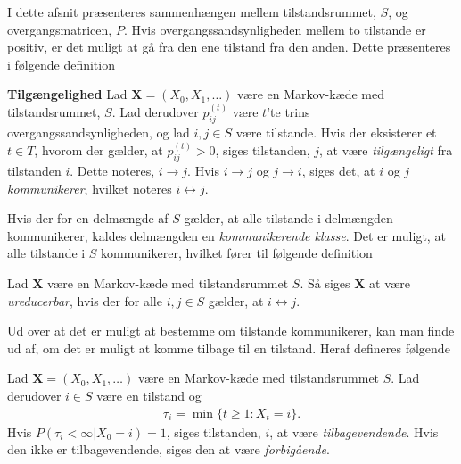 I dette afsnit præsenteres sammenhængen mellem tilstandsrummet, $S$, og overgangsmatricen, $P$. Hvis overgangssandsynligheden mellem to tilstande er positiv, er det muligt at gå fra den ene tilstand fra den anden. Dette præsenteres i følgende definition

\begin{minipage}\textwidth
\begin{defn}\textbf{Tilgængelighed} \label{def:tilgængelighed} %
\newline
Lad $\bm X = (X_0, X_1, \dots)$ være en Markov-kæde med tilstandsrummet, $S$. Lad derudover $p_{ij}^{(t)}$ være $t$'te trins overgangssandsynligheden, og lad $i,j \in S$ være tilstande. Hvis der eksisterer et $t\in T$, hvorom der gælder, at $p_{ij}^{(t)}>0$, siges tilstanden, $j$, at være \textit{tilgængeligt} fra tilstanden $i$. Dette noteres, $i\to j$. Hvis $i\to j$ og $j\to i$, siges det, at $i$ og $j$ \textit{kommunikerer}, hvilket noteres $i\leftrightarrow j$.
\end{defn}
\end{minipage}

Hvis der for en delmængde af $S$ gælder, at alle tilstande i delmængden kommunikerer, kaldes delmængden en \textit{kommunikerende klasse}. Det er muligt, at alle tilstande i $S$ kommunikerer, hvilket fører til følgende definition 

\begin{minipage}\textwidth
\begin{defn}\textbf{} %
\newline
Lad $\bm X$ være en Markov-kæde med tilstandsrummet $S$. Så siges $\bm X$ at være \textit{ureducerbar}, hvis der for alle $i,j \in S$ gælder, at $i \leftrightarrow j$.
\end{defn}
\end{minipage}

Ud over at det er muligt at bestemme om tilstande kommunikerer, kan man finde ud af, om det er muligt at komme tilbage til en tilstand. Heraf defineres følgende

\begin{minipage}\textwidth
\begin{defn}\textbf{} %
\newline
Lad $\bm X = (X_0, X_1, \dots)$ være en Markov-kæde med tilstandsrummet $S$. Lad derudover $i\in S$ være en tilstand og
\begin{align*}
    \tau_i=\min\{t\geq1:X_t=i\}.
\end{align*}
Hvis $P(\tau_i<\infty|X_0=i)=1$, siges tilstanden, $i$, at være \textit{tilbagevendende}. Hvis den ikke er tilbagevendende, siges den at være \textit{forbigående}.
\end{defn}
\end{minipage}

